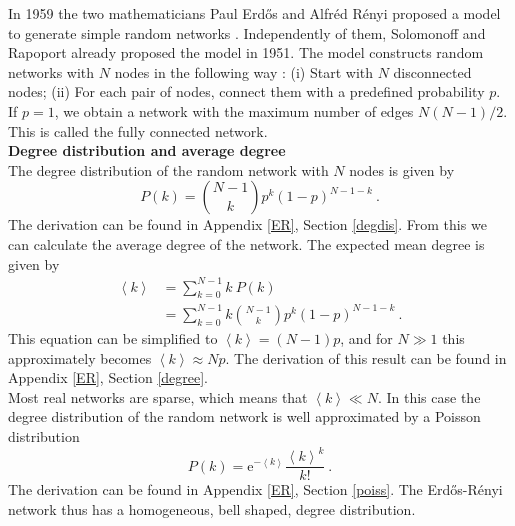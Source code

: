 \documentclass[11 pt , letterpaper , twoside , openright]{book}
\begin{document}
In 1959 the two mathematicians Paul Erd\H{o}s and Alfr\'{e}d R\'{e}nyi proposed a model to generate simple random networks \cite{F.Costa2007}. Independently of them, Solomonoff and Rapoport already proposed the model in 1951. The model constructs random networks with $N$ nodes in the following way \cite{Albert2002}: (i) Start with $N$ disconnected nodes; (ii) For each pair of nodes, connect them with a predefined probability $p$.\\
\newline
If $p=1$, we obtain a network with the maximum number of edges $N(N-1)/2$. This is called the fully connected network.\\
\newline
\textbf{Degree distribution and average degree}\\
\newline
The degree distribution of the random network with $N$ nodes is given by
\begin{equation}\label{degDistRan}
	P(k) = \binom{N-1}{k}p^k (1-p)^{N-1-k} \ .
\end{equation}
The derivation can be found in Appendix \ref{ER}, Section \ref{degdis}. From this we can calculate the average degree of the network. The expected mean degree is given by \cite{Hopcroft2006}
\begin{equation}\label{avDeg}
\begin{split}
	\left<k\right> &= \sum_{k=0}^{N-1} k\  P(k)  \\
&= \sum_{k=0}^{N-1} k \binom{N-1}{k}p^k (1-p)^{N-1-k} \ .
\end{split}
\end{equation}
This equation can be simplified to $\left<k\right> = (N-1)p$, and for $N \gg 1$ this approximately becomes $\left<k\right> \approx Np$. The derivation of this result can be found in Appendix \ref{ER}, Section \ref{degree}.\\
\newpage
\noindent
Most real networks are sparse, which means that $\left<k\right> \ll N$. In this case the degree distribution of the random network is well approximated by a Poisson distribution \cite{Albert2014} 
\begin{equation}
	P(k) = \mathrm{e}^{-\left<k\right>} \frac{\left<k\right>^k}{k!} \ .
\end{equation}
The derivation can be found in Appendix \ref{ER}, Section \ref{poiss}. The Erd\H{o}s-R\'{e}nyi network thus has a homogeneous, bell shaped, degree distribution.\\
\newline
\end{document}
